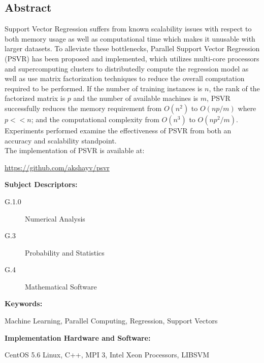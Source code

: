 \documentclass[12pt]{article}
\begin{document}
\begin{center}
\section*{Abstract}
%
\end{center}
\begin{adjustwidth}{2 cm}{2 cm} 
Support Vector Regression suffers from known scalability issues with respect to both memory usage as well as computational time which makes it unusable with larger datasets. To alleviate these bottlenecks, Parallel Support Vector Regression (PSVR) has been proposed and implemented, which utilizes multi-core processors and supercomputing clusters to distributedly compute the regression model as well as use matrix factorization techniques to reduce the overall computation required to be performed. If the number of training instances is $n$, the rank of the factorized matrix is $p$ and the number of available machines is $m$, PSVR successfully reduces the memory requirement from $O(n^2)$ to $O(np/m)$ where $p << n$; and the computational complexity from $O(n^3)$ to $O(np^2/m)$. Experiments performed examine the effectiveness of PSVR from both an accuracy and scalability standpoint.\\
The implementation of PSVR is available at:
\begin{center}
 \url{https://github.com/akshayv/psvr}
 \end{center}
\end{adjustwidth}
\vspace{1 cm} 

\begin{adjustwidth}{0 cm}{0 cm}
{\bf Subject Descriptors:} 
\end{adjustwidth}
\begin{adjustwidth}{2 cm}{2 cm}
\begin{description}
\item[G.1.0]	 Numerical Analysis
\item[G.3]    Probability and Statistics
\item[G.4] Mathematical Software
\end{description}
\end{adjustwidth}
{\bf Keywords:} 
\begin{adjustwidth}{2 cm}{2 cm}
Machine Learning, Parallel Computing, Regression, Support Vectors\\
\end{adjustwidth} 
{\bf Implementation Hardware and Software:}
\begin{adjustwidth}{2 cm}{2 cm}
CentOS 5.6 Linux, C++, MPI 3, Intel Xeon Processors, LIBSVM
\end{adjustwidth} 
\newpage
\end{document}

